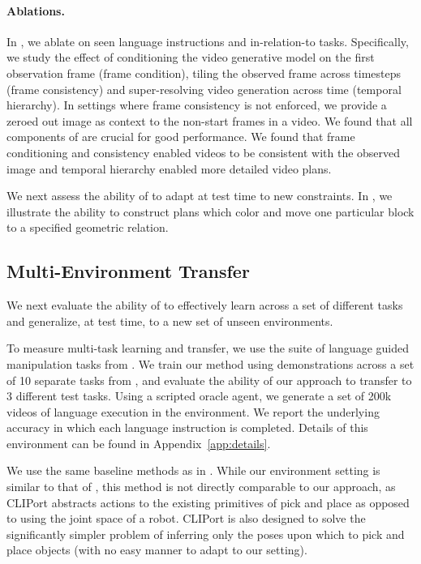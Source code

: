 
\vspace{-7pt}
\paragraph{Ablations.} In , we ablate \model on seen language instructions and in-relation-to tasks. Specifically, we study the effect of conditioning the video generative model on the first observation frame (frame condition), tiling the observed frame across timesteps (frame consistency) and super-resolving video generation across time (temporal hierarchy). In settings where frame consistency is not enforced, we provide a zeroed out image as context to the non-start frames in a video. We found that all components of \model are crucial for good performance. We found that frame conditioning and consistency enabled videos to be consistent with the observed image and temporal hierarchy enabled more detailed video plans. 


 We next assess the ability of \model to adapt at test time to new constraints.  In , we illustrate the ability to construct plans which color and move one particular block to a specified geometric relation. 

\subsection{Multi-Environment Transfer}
\label{sect:multi}




We next evaluate the ability of \model to effectively learn across a set of different tasks and generalize, at test time, to a new set of unseen environments.

 To measure multi-task learning and transfer, we use the suite of language guided manipulation tasks from \citep{shridhar2022cliport}. We train our method using demonstrations across a set of 10 separate tasks from \citep{shridhar2022cliport}, and evaluate the ability of our approach to transfer to 3 different test tasks. 
Using a scripted oracle agent, we generate a set of 200k videos of language execution in the environment. We report the underlying accuracy in which each language instruction is completed. Details of this environment can be found in Appendix~\ref{app:details}.

 We use the same baseline methods as in . 
While our environment setting is similar to that of \citep{shridhar2022cliport}, this method is not directly comparable to our approach, as CLIPort abstracts actions to the existing primitives of pick and place as opposed to using the joint space of a robot. CLIPort is also designed to solve the significantly simpler problem of inferring only the poses upon which to pick and place objects (with no easy manner to adapt to our setting). 

